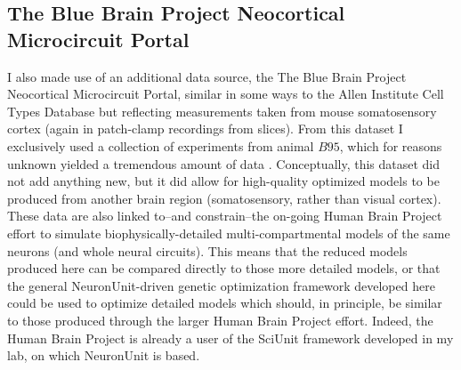 \subsection{The Blue Brain Project Neocortical Microcircuit Portal}
\label{sec:bluebrain-data}
I also made use of an additional data source, the The Blue Brain Project Neocortical Microcircuit Portal, similar in some ways to the Allen Institute Cell Types Database but reflecting measurements taken from mouse somatosensory cortex (again in patch-clamp recordings from slices).
From this dataset I exclusively used a collection of experiments from animal $B95$, which for reasons unknown yielded a tremendous amount of data \citep{ramaswamy2015neocortical}.
Conceptually, this dataset did not add anything new, but it did allow for high-quality optimized models to be produced from another brain region (somatosensory, rather than visual cortex).
These data are also linked to--and constrain--the on-going Human Brain Project effort to simulate biophysically-detailed multi-compartmental models of the same neurons (and whole neural circuits).
This means that the reduced models produced here can be compared directly to those more detailed models, or that the general NeuronUnit-driven genetic optimization framework developed here could be used to optimize detailed models which should, in principle, be similar to those produced through the larger Human Brain Project effort.
Indeed, the Human Brain Project is already a user of the SciUnit framework developed in my lab, on which NeuronUnit is based.


